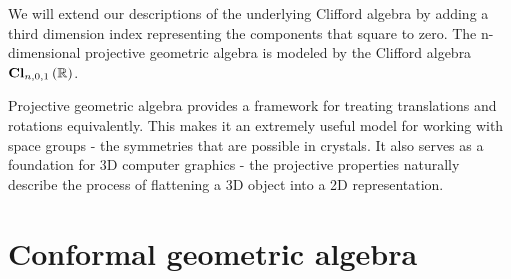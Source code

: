 We will extend our descriptions of the underlying Clifford algebra by adding a third dimension index
representing the components that square to zero. The n-dimensional projective geometric algebra is
modeled by the Clifford algebra $\operatorname{\mathbf{Cl}}_{n,0,1}\left(\mathbb{R}\right)$.

Projective geometric algebra provides a framework for treating translations and rotations
equivalently. This makes it an extremely useful model for working with space groups - the symmetries
that are possible in crystals. It also serves as a foundation for 3D computer graphics - the
projective properties naturally describe the process of flattening a 3D object into a 2D
representation.

\section{Conformal geometric algebra}
